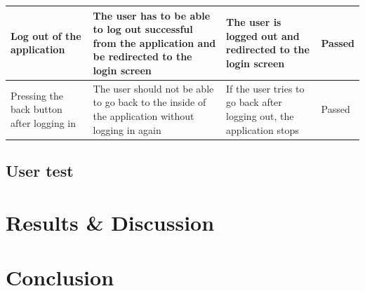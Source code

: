 \documentclass[paper=a4, fontsize=12pt,DIV=14]{scrartcl}    %
\begin{document}
\begin{tabular}{|p{4.3cm}|p{4.3cm}|p{4.3cm}|p{2cm}|}
                \hline
                Log out of the application
                & The user has to be able to log out successful from the application and be redirected to the login screen
                & The user is logged out and redirected to the login screen
                & Passed\\
                \hline
                Pressing the back button after logging in
                & The user should not be able to go back to the inside of the application without logging in again
                & If the user tries to go back after logging out, the application stops
                & Passed\\
                \hline
            \end{tabular}

            \subsection{User test}



    \newpage
        \section{Results \& Discussion}



    \newpage
        \section{Conclusion}



\end{document}
